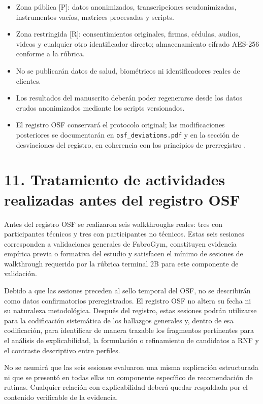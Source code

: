 \documentclass[9pt,a4paper]{extarticle}
\begin{document}
\begin{itemize}
\item Zona pública [P]: datos anonimizados, transcripciones seudonimizadas, instrumentos vacíos, matrices procesadas y scripts.
\item Zona restringida [R]: consentimientos originales, firmas, cédulas, audios, videos y cualquier otro identificador directo; almacenamiento cifrado AES-256 conforme a la rúbrica.
\item No se publicarán datos de salud, biométricos ni identificadores reales de clientes.
\item Los resultados del manuscrito deberán poder regenerarse desde los datos crudos anonimizados mediante los scripts versionados.
\item El registro OSF conservará el protocolo original; las modificaciones posteriores se documentarán en \texttt{osf\_deviations.pdf} y en la sección de desviaciones del registro, en coherencia con los principios de prerregistro \cite{nosek2018}.
\end{itemize}

\section*{11. Tratamiento de actividades realizadas antes del registro OSF}

Antes del registro OSF se realizaron seis walkthroughs reales: tres con participantes técnicos y tres con participantes no técnicos. Estas seis sesiones corresponden a validaciones generales de FabroGym, constituyen evidencia empírica previa o formativa del estudio y satisfacen el mínimo de sesiones de walkthrough requerido por la rúbrica terminal 2B para este componente de validación.

Debido a que las sesiones preceden al sello temporal del OSF, no se describirán como datos confirmatorios preregistrados. El registro OSF no altera su fecha ni su naturaleza metodológica. Después del registro, estas sesiones podrán utilizarse para la codificación sistemática de los hallazgos generales y, dentro de esa codificación, para identificar de manera trazable los fragmentos pertinentes para el análisis de explicabilidad, la formulación o refinamiento de candidatos a RNF y el contraste descriptivo entre perfiles.

No se asumirá que las seis sesiones evaluaron una misma explicación estructurada ni que se presentó en todas ellas un componente específico de recomendación de rutinas. Cualquier relación con explicabilidad deberá quedar respaldada por el contenido verificable de la evidencia.
\end{document}
